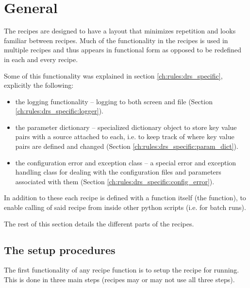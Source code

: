 \ifdevguide
\section{General}
\label{ch:the_recipes:gen_layout}

The recipes are designed to have a layout that minimizes repetition and looks familiar between recipes. Much of the functionality in the recipes is used in multiple recipes and thus appears in functional form as opposed to be redefined in each and every recipe.

Some of this functionality was explained in section \ref{ch:rules:drs_specific}, explicitly the following:
\begin{itemize}
	\item the logging functionality -- l{}ogging to both screen and file (Section \ref{ch:rules:drs_specific:logger}).
	\item the parameter dictionary -- specialized dictionary object to store key value pairs with a source attached to each, i.e. to keep track of where key value pairs are defined and changed (Section \ref{ch:rules:drs_specific:param_dict}).
	\item the configuration error and exception class -- a special error and exception handling class for dealing with the configuration files and parameters associated with them (Section \ref{ch:rules:drs_specific:config_error}).
\end{itemize}

\vspace{0.5cm}
\noindent In addition to these each recipe is defined with a function itself (the \progMAIN function), to enable calling of said recipe from inside other python scripts (i.e. for batch runs).

\vspace{0.5cm}
\noindent The rest of this section details the different parts of the recipes.

\subsection{The setup procedures}
\label{ch:the_recipes:gen_layout:setup}


The first functionality of any recipe \progMAIN function is to setup the recipe for running. This is done in three main steps (recipes may or may not use all three steps).

